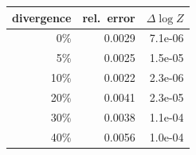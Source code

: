 \begin{tabular}{rrr}
\toprule
divergence & rel.\ error & $\Delta\log Z$ \\
\midrule
0\% & 0.0029 & 7.1e-06 \\
5\% & 0.0025 & 1.5e-05 \\
10\% & 0.0022 & 2.3e-06 \\
20\% & 0.0041 & 2.3e-05 \\
30\% & 0.0038 & 1.1e-04 \\
40\% & 0.0056 & 1.0e-04 \\
\bottomrule
\end{tabular}